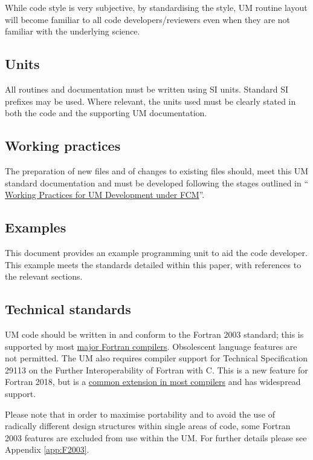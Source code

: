 While code style is very subjective, by standardising the style, UM routine
layout will become familiar to all code developers/reviewers even when 
they are not familiar with the underlying science.

\subsection{Units}

All routines and documentation must be written using SI units. 
Standard SI prefixes may be used. Where relevant, 
the units used must be clearly stated in both the code and the supporting UM documentation.  

\subsection{Working practices}

The preparation of new files and of changes to existing files should, 
meet this UM standard documentation and must be developed following the stages outlined in `` 
\href{https://code.metoffice.gov.uk/trac/um/wiki/working_practices}{Working Practices for UM Development under FCM}''.

\subsection{Examples}

This document provides an example programming unit to aid the code developer.
This example meets the standards detailed within this paper, with
references to the relevant sections.


\subsection{Technical standards}
UM code should be written in and conform to the Fortran 2003 standard;
this is supported by most
\href{http://fortranwiki.org/fortran/show/Fortran+2003+status}
{major Fortran compilers}. Obsolescent language features are not permitted.
The UM also requires compiler support for
Technical Specification 29113 on the Further Interoperability of Fortran with C.
This is a new feature for Fortran 2018, but is a
\href{http://fortranwiki.org/fortran/show/Compiler+Support+for+Modern+Fortran}
{common extension in most compilers} and has widespread support.

Please note that in order to maximise portability and to avoid the use of
radically different design structures within single areas of code, some Fortran
2003 features are excluded from use within the UM. For further details please
see Appendix \ref{app:F2003}.


